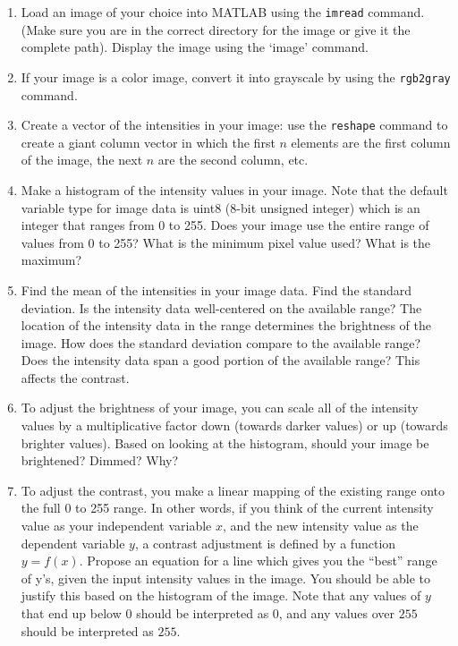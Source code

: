 \begin{prob}
    \begin{enumerate}
    \item  Load an image of your choice into MATLAB using the \texttt{imread} command.  (Make sure you are in the correct directory for the image or give it the complete path). Display the image using the `image' command.
    \item  If your image is a color image, convert it into grayscale by using the \texttt{rgb2gray} command.
    \item  Create a vector of the intensities in your image: use the \texttt{reshape} command to create a giant column vector in which the first $n$ elements are the first column of the image, the next $n$ are the second column, etc.
    \item Make a histogram of the intensity values in your image.  Note that the default variable type for image data is uint8 (8-bit unsigned integer) which is an integer that ranges from 0 to 255.   Does your image use the entire range of values from 0 to 255?  What is the minimum pixel value used?  What is the maximum?
    \item  Find the mean of the intensities in your image data.  Find the standard deviation.  Is the intensity data well-centered on the available range?  The location of the intensity data in the range determines the brightness of the image. How does the standard deviation compare to the available range?  Does the intensity data span a good portion of the available range? This affects the contrast.
    \item  To adjust the brightness of your image, you can scale all of the intensity values by a multiplicative factor down (towards darker values) or up (towards brighter values).  Based on looking at the histogram, should your image be brightened?  Dimmed?  Why?
 \item To adjust the contrast, you make a linear mapping of the existing range onto the full 0 to 255 range.  In other words, if you think of the current intensity value as your independent variable $x$, and the new intensity value as the dependent variable $y$, a contrast adjustment is defined by a function $y = f(x)$.  Propose an equation for a line which gives you the ``best'' range of y's, given the input intensity values in the image.  You should be able to justify this based on the histogram of the image.  Note that any values  of $y$ that end up below 0 should be interpreted as 0, and any values over $255$ should be interpreted as $255$.

\end{enumerate}
\end{prob}
